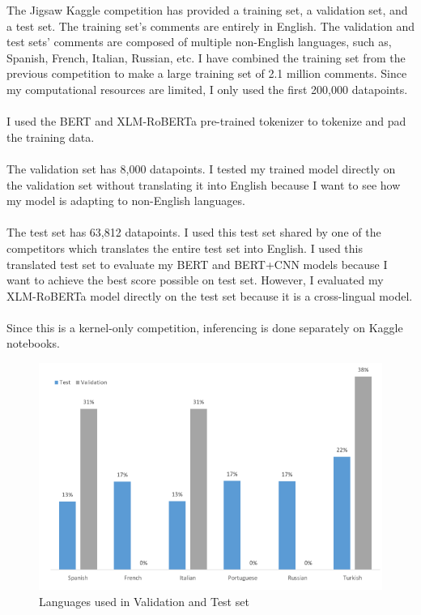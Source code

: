 \documentclass[11pt,a4paper]{article}
\begin{document}
The Jigsaw Kaggle competition \cite{kaggle} has provided a training set, a validation set, and a test set. The training set’s comments are entirely in English. The validation and test sets' comments are composed of multiple non-English languages, such as, Spanish, French, Italian, Russian, etc. I have combined the training set from the previous competition to make a large training set of 2.1 million comments. Since my computational resources are limited, I only used the first 200,000 datapoints. \\
\\
I used the BERT and XLM-RoBERTa pre-trained tokenizer to tokenize and pad the training data.\\
\\
The validation set has 8,000 datapoints. I tested my trained model directly on the validation set without translating it into English because I want to see how my model is adapting to non-English languages.\\
\\
The test set has 63,812 datapoints. I used this test set shared by one of the competitors \cite{test-en-df} which translates the entire test set into English. I used this translated test set to evaluate my BERT and BERT+CNN models because I want to achieve the best score possible on test set. However,  I evaluated my XLM-RoBERTa model directly on the test set because it is a cross-lingual model.\\ 
\\
Since this is a kernel-only competition, inferencing is done separately on Kaggle notebooks.

\begin{figure}[!htbp]
	\centering
	\includegraphics[scale=1.5]{figures/data.png}
	\caption{\label{fig:my-label} Languages used in Validation and Test set}
\end{figure}
\end{document}
